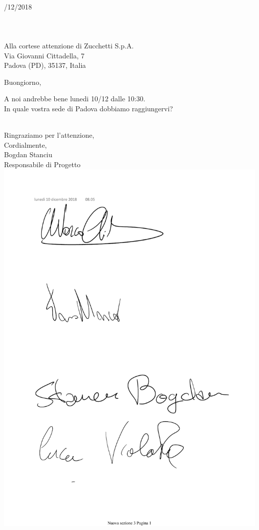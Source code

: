 \documentclass[11pt, a4paper]{letter} %
\begin{document}

\begin{letter}{
	\-\\/12/2018
	\-\\\-\\\-\\\-\\
	Alla cortese attenzione di Zucchetti S.p.A. \\
	Via Giovanni Cittadella, 7\\
	Padova (PD), 35137, Italia
}


\opening{Buongiorno,}

A noi andrebbe bene lunedi 10/12 dalle 10:30.\\
In quale vostra sede di Padova dobbiamo raggiungervi?\-\\\-\\


\closing{Ringraziamo per l'attenzione,\\
Cordialmente,\\
Bogdan Stanciu\\
Responsabile di Progetto
\includegraphics[scale=0.4]{images/BogdanStanciu.pdf}} 



\end{letter}
\end{document}
